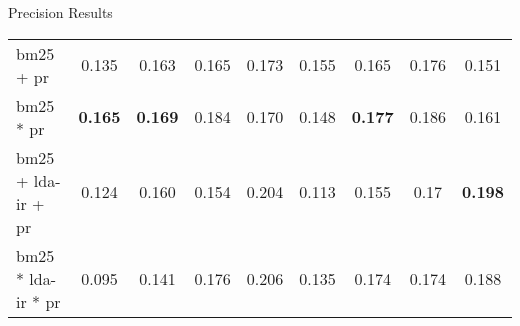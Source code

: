 \begin{frame}{\insertsection}{}
\begin{block}{Precision Results}
\begin{table}
{\begin{tabular}{l|c|c|c|c||c|c|c|c}
					\acrshort{bm25} + \acrshort{pr} & 0.135 & 0.163 & 0.165 & 0.173 & 0.155 & 0.165 & 0.176 & 0.151 \\
					\acrshort{bm25} * \acrshort{pr} & \textbf{0.165} & \textbf{0.169} & 0.184 & 0.170 & 0.148 & \textbf{0.177} & 0.186 & 0.161\\
					\acrshort{bm25} + \acrshort{lda}-\acrshort{ir} + \acrshort{pr} & 0.124 & 0.160 & 0.154 & 0.204 & 0.113 & 0.155 & 0.17 & \textbf{0.198}\\
					\acrshort{bm25} * \acrshort{lda}-\acrshort{ir} * \acrshort{pr} & 0.095 & 0.141 & 0.176 & 0.206 & 0.135 & 0.174 & 0.174 & 0.188\\
				\end{tabular}
			}
		\end{table}
	\end{block}
\end{frame}

